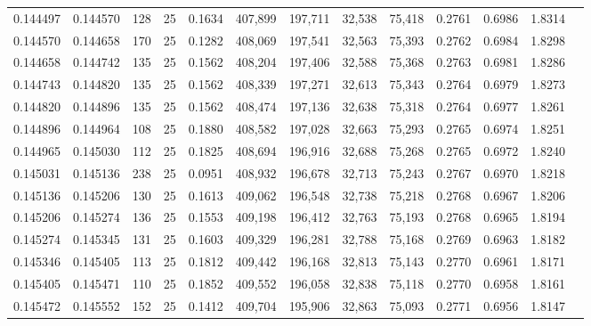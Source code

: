 \begin{tabular}{rrrrrrrrrrrrr}
0.144497 & 0.144570 &   128 &  25 &                                     0.1634 & 407,899 & 197,711 &  32,538 &  75,418 & 0.2761 & 0.6986 & 1.8314 \\
0.144570 & 0.144658 &   170 &  25 &                                     0.1282 & 408,069 & 197,541 &  32,563 &  75,393 & 0.2762 & 0.6984 & 1.8298 \\
0.144658 & 0.144742 &   135 &  25 &                                     0.1562 & 408,204 & 197,406 &  32,588 &  75,368 & 0.2763 & 0.6981 & 1.8286 \\
0.144743 & 0.144820 &   135 &  25 &                                     0.1562 & 408,339 & 197,271 &  32,613 &  75,343 & 0.2764 & 0.6979 & 1.8273 \\
0.144820 & 0.144896 &   135 &  25 &                                     0.1562 & 408,474 & 197,136 &  32,638 &  75,318 & 0.2764 & 0.6977 & 1.8261 \\
0.144896 & 0.144964 &   108 &  25 &                                     0.1880 & 408,582 & 197,028 &  32,663 &  75,293 & 0.2765 & 0.6974 & 1.8251 \\
0.144965 & 0.145030 &   112 &  25 &                                     0.1825 & 408,694 & 196,916 &  32,688 &  75,268 & 0.2765 & 0.6972 & 1.8240 \\
0.145031 & 0.145136 &   238 &  25 &                                     0.0951 & 408,932 & 196,678 &  32,713 &  75,243 & 0.2767 & 0.6970 & 1.8218 \\
0.145136 & 0.145206 &   130 &  25 &                                     0.1613 & 409,062 & 196,548 &  32,738 &  75,218 & 0.2768 & 0.6967 & 1.8206 \\
0.145206 & 0.145274 &   136 &  25 &                                     0.1553 & 409,198 & 196,412 &  32,763 &  75,193 & 0.2768 & 0.6965 & 1.8194 \\
0.145274 & 0.145345 &   131 &  25 &                                     0.1603 & 409,329 & 196,281 &  32,788 &  75,168 & 0.2769 & 0.6963 & 1.8182 \\
0.145346 & 0.145405 &   113 &  25 &                                     0.1812 & 409,442 & 196,168 &  32,813 &  75,143 & 0.2770 & 0.6961 & 1.8171 \\
0.145405 & 0.145471 &   110 &  25 &                                     0.1852 & 409,552 & 196,058 &  32,838 &  75,118 & 0.2770 & 0.6958 & 1.8161 \\
0.145472 & 0.145552 &   152 &  25 &                                     0.1412 & 409,704 & 195,906 &  32,863 &  75,093 & 0.2771 & 0.6956 & 1.8147 \\

\end{tabular}
